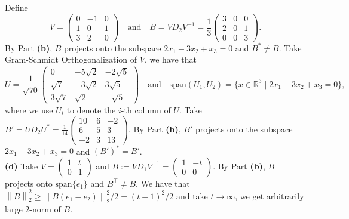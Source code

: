 \documentclass[11pt]{article}
\theoremstyle{plain}
\theoremstyle{definition}
\theoremstyle{remark}
\newcommand{\norm}[1]{\left\lVert #1 \right\rVert}
\newcommand{\R}{\mathbb{R}}
\def\-#1{\mathrm{#1}} %
\begin{document}
Define 
$$
    V = \begin{pmatrix}
           0 & -1 & 0
        \\ 1 & 0 & 1
        \\ 3 & 2 & 0
    \end{pmatrix}\quad \text{and}\quad B = V D_2 V^{-1} = \frac 13\begin{pmatrix}
           3 & 0 & 0
        \\ 2 & 0 & 1
        \\ 0 & 0 & 3
    \end{pmatrix} .
$$
By Part \textbf{(b)}, $B$ projects onto the subspace $2x_1-3x_2+x_3=0$ and $B^* \neq B$.
Take Gram-Schmidt Orthogonalization of $V$, we have that 
$$
    U = \frac 1{\sqrt{70}}\begin{pmatrix}
           0 & -5\sqrt{2} & -2\sqrt{5}
        \\ \sqrt 7 & -3\sqrt 2 & 3\sqrt 5
        \\ 3\sqrt 7 & \sqrt 2 & -\sqrt 5
    \end{pmatrix} \quad \text{and} \quad \-{span}(U_1,U_2) = \{x\in \R^{3}\mid 2x_1-3x_2+x_3=0\},
$$
where we use $U_i$ to denote the $i$-th column of $U$.
Take $B' = UD_2U^* = \frac 1{14}\begin{pmatrix}10 & 6 & -2\\6 & 5 & 3\\-2 & 3 & 13\end{pmatrix}$.
By Part \textbf{(b)}, $B'$ projects onto the subspace $2x_1-3x_2+x_3=0$ and $(B')^* = B'$.
\\\textbf{(d)} 
Take $V = \begin{pmatrix}1 & t\\0 & 1\end{pmatrix}$ and $B := VD_1V^{-1} =  \begin{pmatrix}1 & -t\\0 & 0\end{pmatrix}$.
By Part \textbf{(b)}, $B$ projects onto $\-{span}\{e_1\}$ and $B^\top \neq B$.
We have that $\norm{B}_2^2 \geq \norm{B(e_1-e_2)}_2^2/2 = (t+1)^2/2$ and take $t\to \infty$, we get arbitrarily large $2$-norm of $B$.
\end{document}
